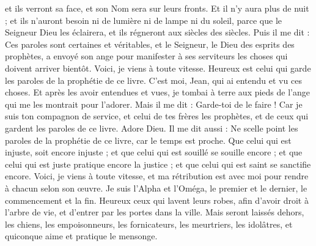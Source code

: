 \begin{multicols}{2}
et ils verront sa face, et son Nom sera sur leurs fronts.
Et il n'y aura plus de nuit ; et ils n’auront besoin ni de lumière ni de lampe ni du soleil, parce que le Seigneur Dieu les éclairera, et ils régneront aux siècles des siècles.
Puis il me dit : Ces paroles sont certaines et véritables, et le Seigneur, le Dieu des esprits des prophètes, a envoyé son ange pour manifester à ses serviteurs les choses qui doivent arriver bientôt.
Voici, je viens à toute vitesse{}. Heureux est celui qui garde les paroles de la prophétie de ce livre.
C’est moi, Jean, qui ai entendu et vu ces choses{}. Et après les avoir entendues et vues, je tombai à terre aux pieds de l’ange qui me les montrait pour l’adorer.
Mais il me dit : Garde-toi de le faire ! Car je suis ton compagnon de service{}, et celui de tes frères les prophètes, et de ceux qui gardent les paroles de ce livre. Adore Dieu.
Il me dit aussi : Ne scelle point les paroles de la prophétie de ce livre, car le temps est proche.
Que celui qui est injuste, soit encore injuste ; et que celui qui est souillé se souille encore ; et que celui qui est juste pratique encore la justice ; et que celui qui est saint se sanctifie encore.
Voici, je viens à toute vitesse, et ma rétribution est avec moi{} pour rendre à chacun selon son œuvre.
Je suis l'Alpha et l'Oméga, le premier et le dernier, le commencement et la fin.
Heureux ceux qui lavent leurs robes, afin d’avoir droit à l’arbre de vie, et d’entrer par les portes dans la ville.
Mais seront laissés dehors, les chiens, les empoisonneurs, les fornicateurs, les meurtriers, les idolâtres, et quiconque aime et pratique le mensonge.

\end{multicols}
